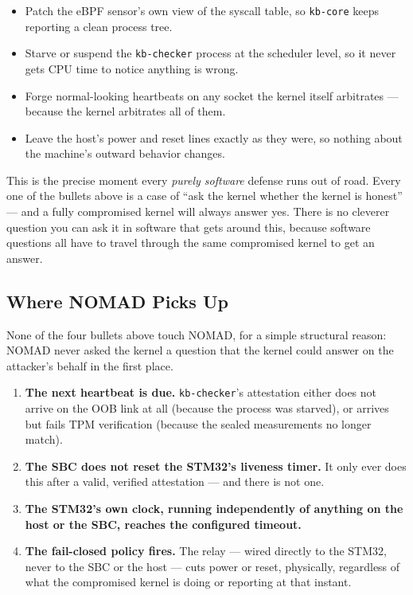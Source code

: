 \documentclass[11pt,a4paper]{article}
\begin{document}
\begin{itemize}
  \item Patch the eBPF sensor's own view of the syscall table, so
    \texttt{kb-core} keeps reporting a clean process tree.
  \item Starve or suspend the \texttt{kb-checker} process at the
    scheduler level, so it never gets CPU time to notice anything is
    wrong.
  \item Forge normal-looking heartbeats on any socket the kernel itself
    arbitrates --- because the kernel arbitrates all of them.
  \item Leave the host's power and reset lines exactly as they were, so
    nothing about the machine's outward behavior changes.
\end{itemize}

\begin{plainbox}
This is the precise moment every \emph{purely software} defense runs out
of road. Every one of the bullets above is a case of ``ask the kernel
whether the kernel is honest'' --- and a fully compromised kernel will
always answer yes. There is no cleverer question you can ask it in
software that gets around this, because software questions all have to
travel through the same compromised kernel to get an answer.
\end{plainbox}

\subsection{Where NOMAD Picks Up}

None of the four bullets above touch NOMAD, for a simple structural
reason: NOMAD never asked the kernel a question that the kernel could
answer on the attacker's behalf in the first place.

\begin{enumerate}
  \item \textbf{The next heartbeat is due.} \texttt{kb-checker}'s
    attestation either does not arrive on the OOB link at all (because
    the process was starved), or arrives but fails TPM verification
    (because the sealed measurements no longer match).
  \item \textbf{The SBC does not reset the STM32's liveness timer.} It
    only ever does this after a valid, verified attestation --- and
    there is not one.
  \item \textbf{The STM32's own clock, running independently of
    anything on the host or the SBC, reaches the configured timeout.}
  \item \textbf{The fail-closed policy fires.} The relay --- wired
    directly to the STM32, never to the SBC or the host --- cuts power
    or reset, physically, regardless of what the compromised kernel is
    doing or reporting at that instant.
\end{enumerate}
\end{document}
